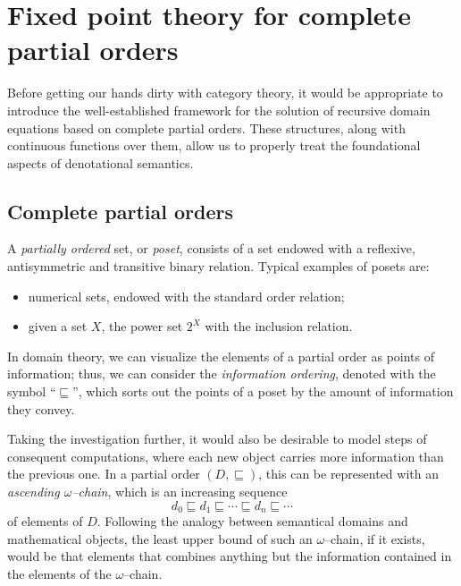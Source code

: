 \section[Fixed point theory for cpos]%
{Fixed point theory for complete partial orders}\label{sec-1}

Before getting our hands dirty with category theory, it would be appropriate to
introduce the well-established framework for the solution of recursive domain
equations based on complete partial orders.
These structures, along with continuous functions over them, allow us to properly treat the foundational aspects of denotational semantics.

\subsection[Complete partial orders]{Complete partial orders}

A \emph{partially ordered} set, or \emph{poset}, consists of a set endowed with a reflexive, antisymmetric and transitive binary relation.
Typical examples of posets are:
\begin{itemize}
  \item numerical sets, endowed with the standard order relation;
  \item given a set \(X\), the power set \(2^X\) with the inclusion relation.
\end{itemize}
In domain theory, we can visualize the elements of a partial order as points of information; thus, we can consider the \emph{information ordering}, denoted with the symbol ``\(\sqsubseteq\)'', which sorts out the points of a poset by the amount of information they convey.

Taking the investigation further, it would also be desirable to model steps of consequent computations, where each new object carries more information than the previous one.
In a partial order \((D, {}\sqsubseteq)\), this can be represented with an
\emph{ascending \(\omega\)--chain}, which is an increasing sequence
\begin{equation*}
  d_0 \sqsubseteq d_1 \sqsubseteq \dotsb \sqsubseteq d_n \sqsubseteq \dotsb{}
\end{equation*}
of elements of \(D\).
Following the analogy between semantical domains and mathematical objects, the least upper bound of such an \(\omega\)--chain, if it exists, would be that elements that combines anything but the information contained in the elements of the \(\omega\)--chain.

